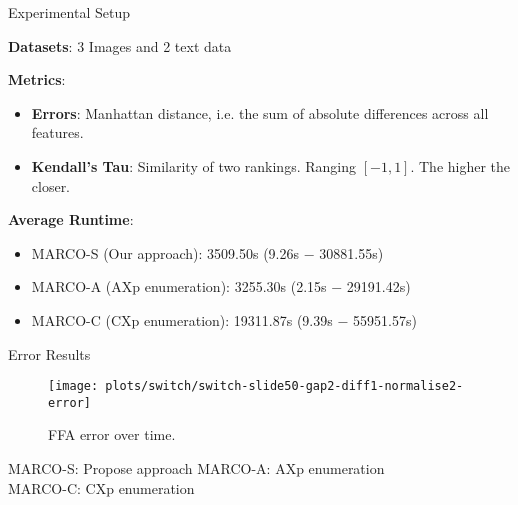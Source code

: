%
%



\begin{frame}{Experimental Setup}
	
	\textbf{Datasets}: 3 Images and 2 text data
	
	\textbf{Metrics}: 
	\begin{itemize}
		\item \textbf{Errors}:  Manhattan distance, i.e. the sum of absolute differences across all features. 
			\item \textbf{Kendall's Tau}: Similarity of two rankings. 
			Ranging $[-\text{1}, \text{1}]$.
			The higher the closer.

	\end{itemize}
	
	\textbf{Average Runtime}: 
	\begin{itemize}
		\item MARCO-S (Our approach): 3509.50s (9.26s $-$ 30881.55s)
		\item MARCO-A (AXp enumeration): 3255.30s (2.15s $-$ 29191.42s)
		\item MARCO-C (CXp enumeration): 19311.87s (9.39s $-$ 55951.57s)
	\end{itemize}
\end{frame}

\begin{frame}{Error Results}
	\begin{figure}[!t]
	\centering
	    \texttt{[image: plots/switch/switch-slide50-gap2-diff1-normalise2-error]}
	    \caption{FFA error over time.} 
	    \label{fig:error}
	\end{figure}
		{\large{} \color{orange}\normalsize MARCO-S}: Propose approach
		{\large{} \color{orange}\normalsize MARCO-A}: AXp enumeration  \\   
		{\large{} \color{orange}\normalsize MARCO-C}: CXp enumeration
\end{frame}


